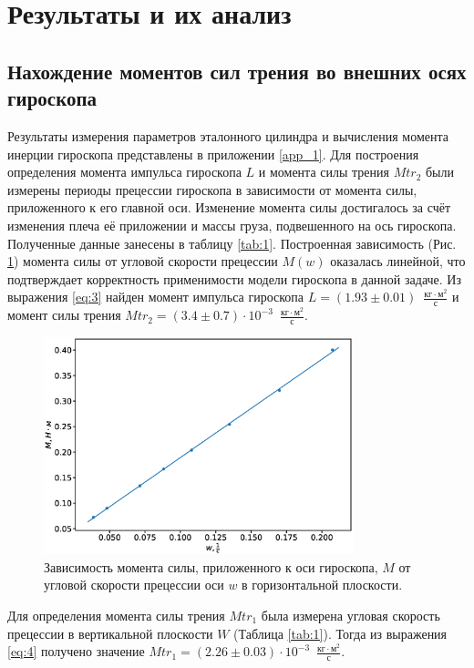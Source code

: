 \documentclass[12pt]{article}
\begin{document}
\section{Результаты и их анализ}
\subsection{Нахождение моментов сил трения во внешних осях гироскопа}
Результаты измерения параметров эталонного цилиндра и вычисления момента инерции гироскопа представлены в приложении \ref{app_1}.
Для построения определения момента импульса гироскопа $L$ и момента силы трения $Mtr_2$ были измерены периоды прецессии гироскопа в зависимости от момента силы, 
приложенного к его главной оси. Изменение момента силы достигалось за счёт изменения плеча её приложении и массы груза, подвешенного 
на ось гироскопа. Полученные данные занесены в таблицу \ref{tab:1}. Построенная зависимость (Рис. \ref{fig:2}) момента силы от угловой скорости прецессии $M(w)$
оказалась линейной, что подтверждает корректность применимости модели гироскопа в данной задаче. Из выражения \ref{eq:3} найден момент импульса
гироскопа $L = (1.93 \pm 0.01)$~$\frac{\textrm{кг} \cdot \textrm{м}^2}{\textrm{с}}$ и момент силы трения 
$Mtr_2 = (3.4 \pm 0.7) \cdot 10^{-3}$~$\frac{\textrm{кг} \cdot \textrm{м}^2}{\textrm{с}}$.
\begin{figure}[H]
    \begin{center}
        \includegraphics[width=0.8\textwidth]{1.eps}
    \end{center}
    \caption{Зависимость момента силы, приложенного к оси гироскопа, $M$ от угловой скорости прецессии оси $w$ в горизонтальной плоскости.}
    \label{fig:2}
\end{figure}
Для определения момента силы трения $Mtr_1$ была измерена угловая скорость прецессии в вертикальной плоскости $W$ (Таблица \ref{tab:1}).
Тогда из выражения \ref{eq:4} получено значение $Mtr_1 = (2.26 \pm 0.03) \cdot 10^{-3}$~$\frac{\textrm{кг} \cdot \textrm{м}^2}{\textrm{с}}$.
\end{document}
